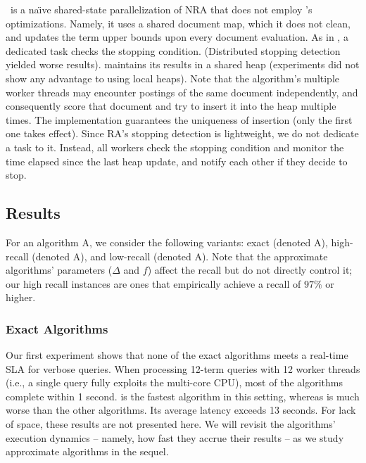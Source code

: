 \pNRA\ is a na\"{\i}ve shared-state parallelization of NRA that does not employ \alg's optimizations. 
Namely, it uses a shared document map, which it does not clean, and updates the term
upper bounds upon every document evaluation. As in \alg, a dedicated task checks the stopping condition.
(Distributed stopping detection yielded worse results).
{\pRA} maintains its results in a shared heap (experiments did not show any advantage to using local heaps).
Note that the algorithm's multiple worker threads may encounter postings of the same document independently, 
and consequently score that document and try to insert it into the heap multiple times. The implementation guarantees 
the uniqueness of insertion (only the first one takes effect).
Since RA's stopping detection is lightweight, we do not dedicate a task to it. Instead, all workers check the stopping condition and monitor the time elapsed since the last heap update, and notify each other if they 
decide to stop.



\subsection{Results}
\label{ssec:results}

For an algorithm A, we consider the following variants: exact (denoted A\ex), high-recall (denoted A\hi), and
low-recall (denoted A\lo). Note that the approximate algorithms' parameters ($\Delta$ and $f$) affect the recall
but do not directly control it; our high recall instances are ones that empirically achieve a  recall of $97\%$ or 
higher.


\subsubsection{Exact Algorithms}


Our first experiment shows that none of the exact algorithms meets a real-time SLA for  verbose queries. 
When processing 12-term queries with 12 worker threads (i.e., a single query fully exploits the multi-core CPU), most of the algorithms complete within 1 second. 
{\pRA} is the fastest algorithm in this setting, whereas
\pNRA\/ is much worse than the other algorithms. Its average latency exceeds 
13 seconds. For lack of space, these results are not presented here.
We will revisit the algorithms' execution dynamics -- namely, how fast they accrue their results -- 
as we study approximate algorithms in the sequel. 
 
